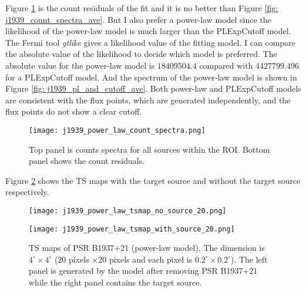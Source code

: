 \documentclass[12pt]{report}
\begin{document}
        Figure \ref{fig: j1939_power_law_count_spectra} is the count residuals of the fit and 
        it is no better than Figure \ref{fig: j1939_count_spectra_ave}. But I also prefer a 
        power-law model since the likelihood of the power-law model is much larger than the 
        PLExpCutoff model. The Fermi tool \textit{gtlike} gives a likelihood value of the 
        fitting model. I can compare the absolute value of the likelihood to decide which model 
        is preferred. The absolute value for the power-law model is $18409504.4$ compared with 
        $4427799.496$ for a PLExpCutoff model. And the spectrum of the power-law model is 
        shown in Figure \ref{fig: j1939_pl_and_cutoff_ave}. Both power-law and PLExpCutoff 
        models are consistent with the flux points, which are generated independently, and 
        the flux points do not show a clear cutoff. 

        \begin{figure}
          \centering 
          \texttt{[image: j1939\_power\_law\_count\_spectra.png]}
          \caption{Top panel is counts spectra for all sources within the ROI. Bottom panel  
            shows the count residuals. }
          \label{fig: j1939_power_law_count_spectra}
        \end{figure}

        Figure \ref{fig: j1939_power_law_tsmap_withsource_20} shows the TS maps with the 
        target source and without the target source respectively. 

        \begin{figure}[!htp]
          \begin{center}
          \begin{minipage}{0.45\textwidth}
            \begin{center} 
              \texttt{[image: j1939\_power\_law\_tsmap\_no\_source\_20.png]}
            \end{center}
          \end{minipage}
          \begin{minipage}{0.45\textwidth}
            \begin{center}
              \texttt{[image: j1939\_power\_law\_tsmap\_with\_source\_20.png]}
            \end{center}
          \end{minipage}
        \end{center}

          \caption{TS maps of PSR B1937+21 (power-law model). The dimension is $4^{\circ} \times 4^{\circ}$
            ($20$ pixels $\times 20$ pixels and each pixel is 
            $0.2^{\circ} \times 0.2^{\circ}$). The left panel is generated by the model 
            after removing PSR B1937+21 while the right panel contains the target source.}
          \label{fig: j1939_power_law_tsmap_withsource_20}
        \end{figure}
\end{document}
